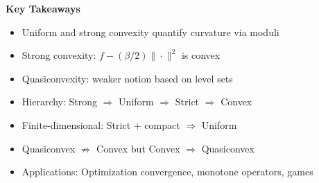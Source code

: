 \documentclass[aspectratio=169,10pt]{beamer}
\begin{document}
\begin{frame}[standout]
\textbf{Key Takeaways}

\begin{itemize}
\item \Large Uniform and strong convexity quantify curvature via moduli
\item \Large Strong convexity: $f - (\beta/2)\|\cdot\|^2$ is convex
\item \Large Quasiconvexity: weaker notion based on level sets
\item \Large Hierarchy: Strong $\Rightarrow$ Uniform $\Rightarrow$ Strict $\Rightarrow$ Convex
\item \Large Finite-dimensional: Strict + compact $\Rightarrow$ Uniform
\item \Large Quasiconvex $\not\Rightarrow$ Convex but Convex $\Rightarrow$ Quasiconvex
\item \Large Applications: Optimization convergence, monotone operators, games
\end{itemize}
\end{frame}
\end{document}
